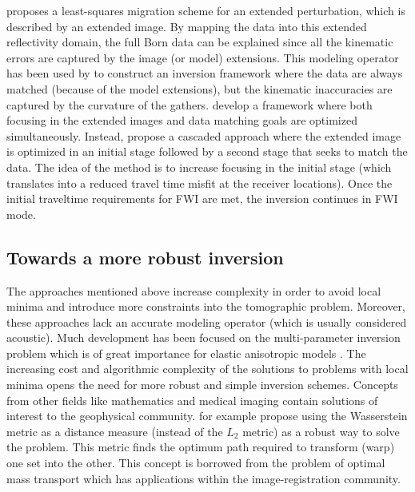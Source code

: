 \cite{GPR:GPR698} proposes a least-squares migration scheme for an
extended perturbation, which is described by an extended image.
By mapping the data into this extended reflectivity domain, the
full Born data can be explained since all the kinematic errors are
captured by the image (or model) extensions. This modeling operator
has been used by \cite{BiondiAli:2014} to construct an inversion
framework where the data are always matched (because of the model
extensions), but the kinematic inaccuracies are captured by the
curvature of the gathers. \cite{FleuryPerrone} develop a framework
where both focusing in the extended images and data matching goals
are optimized simultaneously. Instead, \cite{diaz2013data} propose a
cascaded approach where the extended image is optimized in an initial
stage followed by a second stage that seeks to match the data. The
idea of the method is to increase focusing in the initial stage
(which translates into a reduced travel time misfit at the receiver
locations). Once the initial traveltime requirements for FWI are met,
the inversion continues in FWI mode.

\subsection{Towards a more robust inversion}

The approaches mentioned above increase complexity in order
to avoid local minima and introduce more constraints into the
tomographic problem. Moreover, these approaches lack an accurate
modeling operator (which is usually considered acoustic). Much
development has been focused on the multi-parameter inversion
problem which is of great importance for elastic anisotropic
models \citep{barnes2008feasibility,guasch,Kamath,espen,yuting}.
The increasing cost and algorithmic complexity of the solutions to
problems with local minima opens the need for more robust and simple
inversion schemes. Concepts from other fields like mathematics and
medical imaging contain solutions of interest to the geophysical
community. \cite{engquist2013application} for example propose using
the Wasserstein metric as a distance measure (instead of the $L_2$
metric) as a robust way to solve the problem. This metric finds the
optimum path required to transform (warp) one set into the other.
This concept is borrowed from the problem of optimal mass transport
which has applications within the image-registration community.

